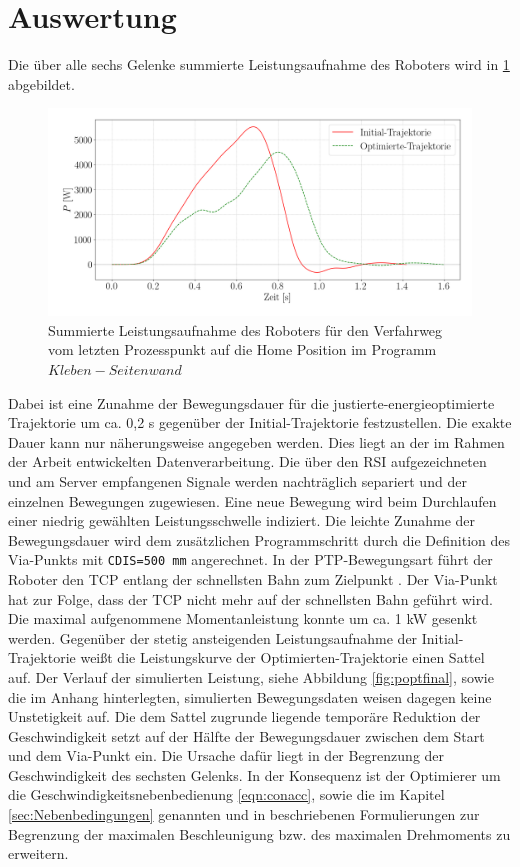 \section{Auswertung}
Die über alle sechs Gelenke summierte Leistungsaufnahme des Roboters wird in \ref{fig:pup} abgebildet. 
%
\begin{figure}[tbph]
	\centering
	\includegraphics[width=1\linewidth]{images/P_up}
	\caption{Summierte Leistungsaufnahme des Roboters für den Verfahrweg vom letzten Prozesspunkt auf die  Home Position im Programm $Kleben-Seitenwand$}
	\label{fig:pup}
\end{figure}
%
Dabei ist eine Zunahme der Bewegungsdauer für die justierte-energieoptimierte Trajektorie um ca. 0,2 s gegenüber der Initial-Trajektorie festzustellen. Die exakte Dauer kann nur näherungsweise angegeben werden. Dies liegt an der im Rahmen der Arbeit entwickelten Datenverarbeitung. Die über den RSI aufgezeichneten und am Server empfangenen Signale werden nachträglich separiert und der einzelnen Bewegungen zugewiesen. Eine neue Bewegung wird beim Durchlaufen einer niedrig gewählten Leistungsschwelle indiziert. Die leichte Zunahme der Bewegungsdauer wird  dem zusätzlichen Programmschritt durch die Definition des Via-Punkts mit \lstinline|CDIS=500 mm| angerechnet. In der PTP-Bewegungsart führt der Roboter den TCP entlang der schnellsten Bahn zum Zielpunkt \cite[S.~429]{KSS.2023}. Der Via-Punkt hat zur Folge, dass der TCP nicht mehr auf der schnellsten Bahn geführt wird. Die maximal aufgenommene Momentanleistung konnte um ca. 1 kW gesenkt werden. 
Gegenüber der stetig ansteigenden Leistungsaufnahme der Initial-Trajektorie weißt die Leistungskurve der Optimierten-Trajektorie einen Sattel auf.  Der Verlauf der simulierten Leistung, siehe Abbildung \ref{fig:poptfinal}, sowie die im Anhang hinterlegten, simulierten Bewegungsdaten weisen dagegen keine Unstetigkeit auf. Die dem Sattel zugrunde liegende temporäre Reduktion der Geschwindigkeit setzt auf der Hälfte der Bewegungsdauer zwischen dem Start und dem Via-Punkt ein. Die Ursache dafür liegt in der Begrenzung der Geschwindigkeit des sechsten Gelenks. In der Konsequenz ist der Optimierer um die Geschwindigkeitsnebenbedienung \ref{eqn:conacc}, sowie die im Kapitel \ref{sec:Nebenbedingungen} genannten und in \cite[S.~5]{Hansen.2012} beschriebenen Formulierungen zur Begrenzung der maximalen Beschleunigung bzw. des maximalen Drehmoments zu erweitern. 
